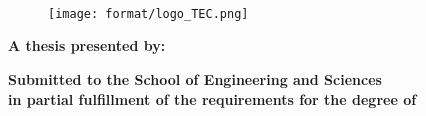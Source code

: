 %
%
%
%
%

\begin{center}\large
    \textbf{\schoolName}\\
    \textbf{\schoolCampus}\\
    \textbf{\schoolDepartment}\\
\end{center}

\begin{center}
\end{center}

\begin{figure}[h!tb]
    \begin{center}
        \texttt{[image: format/logo\_TEC.png]}
    \end{center}
\end{figure}

\begin{center}
    \textbf{\thesisTitle}
\end{center}

\begin{center}
\end{center}

\begin{center}
    \textbf{A thesis presented by:}
\end{center}

\begin{center}
    \textbf{\authorName}
\end{center}


\begin{center}
\end{center}

\begin{center}
    \textbf{Submitted to the
    School of Engineering and Sciences \\
    in partial fulfillment of the requirements for the degree of}
\end{center}

\begin{center}
    \textbf{\schoolProgram}
\end{center}

\null
\vfill

\begin{center}
    \textbf{\schoolPlace} 
\end{center}

\begin{center}
    \textbf{\thesisDate} 
\end{center}

